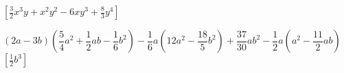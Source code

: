 \begin{esercizio}[\Ast]
\begin{enumeratea}
  \hfill \(\left[\frac{3}{2}x^{3}y+x^{2}y^{2}-6{xy}^{3}+\frac{8}{3}y^{4}\right]\)
 \item \((2a-3b)\left(\dfrac{5}{4}a^{2}+\dfrac{1}{2}{ab}-
        \dfrac{1}{6}b^{2}\right)-\dfrac{1}{6}a\left(12a^{2}-
        \dfrac{18}{5}b^{2}\right)+\dfrac{37}{30}ab^{2}-
        \dfrac{1}{2}a\left(a^{2}-\dfrac{11}{2}{ab}\right)\)
  \hfill \(\left[\frac{1}{2}b^{3}\right]\)
 \end{enumeratea}
\end{esercizio}

